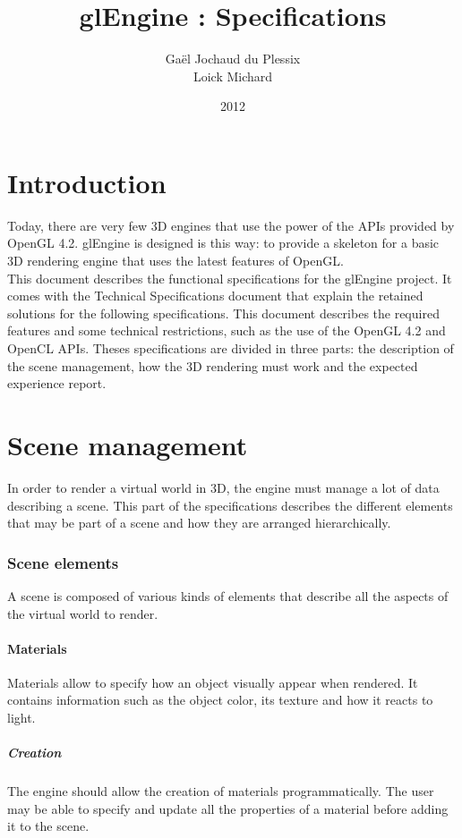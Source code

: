 \documentclass [a4 paper,11pt]{article}
\title {glEngine : Specifications}
\author {Gaël Jochaud du Plessix\\
Loick Michard}
\date {2012}
\begin{document}
\maketitle

\newpage

\tableofcontents

\newpage

\part{Introduction}
Today, there are very few 3D engines that use the power of the APIs provided by OpenGL 4.2. glEngine is designed is this way: to provide a skeleton for a basic 3D rendering engine that uses the latest features of OpenGL.\\
This document describes the functional specifications for the glEngine project. It comes with the Technical Specifications document that explain the retained solutions for the following specifications. This document describes the required features and some technical restrictions, such as the use of the OpenGL 4.2 and OpenCL APIs. Theses specifications are divided in three parts: the description of the scene management, how the 3D rendering must work and the expected experience report.

\part{Scene management}
In order to render a virtual world in 3D, the engine must manage a lot of data describing a scene. This part of the specifications describes the different elements that may be part of a scene and how they are arranged hierarchically.
 
\section{Scene elements}
A scene is composed of various kinds of elements that describe all the aspects of the virtual world to render.

\subsection{Materials}
Materials allow to specify how an object visually appear when rendered. It contains information such as the object color, its texture and how it reacts to light.
\subsubsection{Creation}
The engine should allow the creation of materials programmatically. The user may be able to specify and update all the properties of a material before adding it to the scene.
\end{document}
